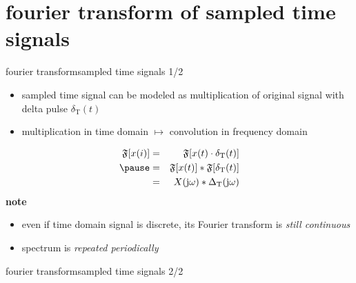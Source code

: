     \section[sampled]{fourier transform of sampled time signals}
        \begin{frame}{fourier transform}{sampled time signals 1/2}
            \begin{itemize}
                \item   sampled time signal can be modeled as multiplication of original signal with delta pulse $\delta_\mathrm{T}(t)$
                \item   multiplication in time domain $\mapsto$ convolution in frequency domain
            \end{itemize}
            \begin{eqnarray*}\label{eq:ft_sampled}
                \mathfrak{F}[x(i)] 	&=& \mathfrak{F}[x(t)\cdot \delta_\mathrm{T}(t)]\nonumber\\
                \pause
                                    &=& \mathfrak{F}[x(t)]\ast \mathfrak{F}[\delta_\mathrm{T}(t)]\nonumber\\
                                    &=& X(\jom)\ast \Delta_\mathrm{T}(\jom) 
            \end{eqnarray*}
            \pause
            \textbf{note}
            \begin{itemize}
                \item   even if time domain signal is discrete, its Fourier transform is \textit{still continuous}
                \item   spectrum is \textit{repeated periodically}
            \end{itemize}
            
        \end{frame}	

        \begin{frame}{fourier transform}{sampled time signals 2/2}
        \end{frame}	

